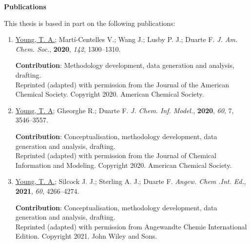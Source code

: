 \documentclass[main.tex]{subfiles}
\begin{document}
	{
	\begin{center}
		{\bfseries\Large \textsf{Publications}}
	\end{center}
	
	This thesis is based in part on the following publications:
	\vspace{0.3cm}
	
	\begin{enumerate}[label=\Roman*., itemsep=2ex]
		
		\item %
		\underline{Young, T. A.}; Martí-Centelles V.; Wang J.; Lusby P. J.;  Duarte F. \emph{J. Am. Chem. Soc.}, {\bfseries{2020}}, \emph{142}, 1300--1310.
		
		
		\begin{minipage}{0.9\textwidth}
			\singlespacing
			{\small {\bfseries{Contribution}}: Methodology development, data generation and analysis, drafting.} \\
			{\small Reprinted (adapted) with permission from the Journal of the American Chemical Society. Copyright 2020. American Chemical Society.}
		\end{minipage}

		
		\item %
		\underline{Young, T. A}; Gheorghe R.;  Duarte F. \emph{J. Chem. Inf. Model.}, {\bfseries{2020}}, \emph{60}, 7, 3546--3557.
		
		\begin{minipage}{0.9\textwidth}
			\singlespacing
			{\small  {\bfseries{Contribution}}: Conceptualisation, methodology development, data generation and analysis, drafting.} \\
			{\small Reprinted (adapted) with permission from the Journal of Chemical Information and Modeling. Copyright 2020. American Chemical Society.}
		\end{minipage}
		
		\item \underline{Young, T. A.};  Silcock J. J.; Sterling A. J.;  Duarte F. \emph{Angew. Chem .Int. Ed.}, {\bfseries{2021}}, \emph{60}, 4266--4274.
		
		
		\begin{minipage}{0.9\textwidth}
			\singlespacing
			{\small  {\bfseries{Contribution}}: Conceptualisation, methodology development, data generation and analysis, drafting.} \\
			{\small Reprinted (adapted) with permission from Angewandte Chemie International Edition. Copyright 2021. John Wiley and Sons.}
		\end{minipage}
		

\end{enumerate}}
\end{document}

